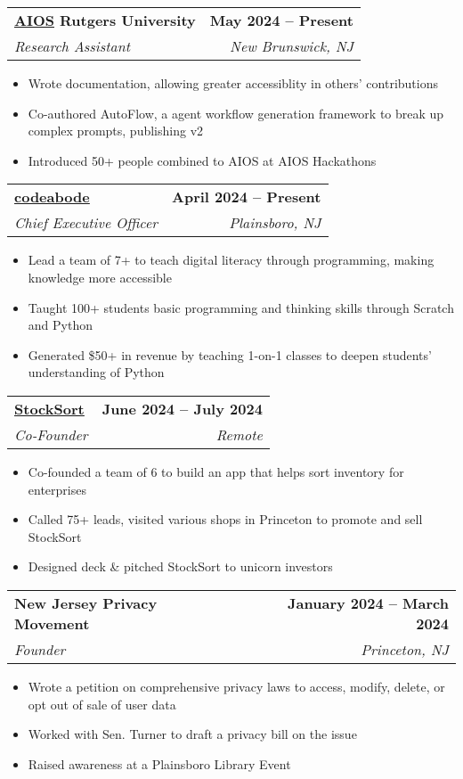 \documentclass[letterpaper,11pt]{article}
\makeatletter
\newcommand{\resumeItem}[1]{
  \item\small{
    {#1 \vspace{-2pt}}
  }
}
\newcommand{\resumeSubheading}[4]{
  \vspace{-2pt}\item
    \begin{tabular*}{1.0\textwidth}[t]{l@{\extracolsep{\fill}}r}
      \textbf{#1} & \textbf{\small #2} \\
      \textit{\small#3} & \textit{\small #4} \\
    \end{tabular*}\vspace{-7pt}
}
\newcommand{\resumeItemListStart}{\begin{itemize}}
\newcommand{\resumeItemListEnd}{\end{itemize}\vspace{-5pt}}
\makeatother
\begin{document}
   \resumeSubheading
     {\href{https://github.com/agiresearch/AIOS}{\underline{AIOS}} Rutgers University}{May 2024 -- Present}
     {Research Assistant}{New Brunswick, NJ}
     \resumeItemListStart
     \resumeItem{Wrote documentation, allowing greater accessiblity in others' contributions}
     \resumeItem{Co-authored AutoFlow, a agent workflow generation framework to break up complex prompts, publishing v2 }
     \resumeItem{Introduced 50+ people combined to AIOS at AIOS Hackathons}
   \resumeItemListEnd

   \resumeSubheading
      {\href{https://codeabode.co}{\underline{codeabode}}}{April 2024 -- Present}
      {Chief Executive Officer}{Plainsboro, NJ}
      \resumeItemListStart
        \resumeItem{Lead a team of 7+ to teach digital literacy through programming, making knowledge more accessible}
        \resumeItem{Taught 100+ students basic programming and thinking skills through Scratch and Python}
        \resumeItem{Generated \$50+ in revenue by teaching 1-on-1 classes to deepen students' understanding of Python}
      \resumeItemListEnd
      

    \resumeSubheading
      {\href{https://web.archive.org/web/20250119183417if_/https://stocksort.net/}{\underline{StockSort}}}{June 2024 -- July 2024}
      {Co-Founder}{Remote}
      \resumeItemListStart
        \resumeItem{Co-founded a team of 6 to build an app that helps sort inventory for enterprises}
        \resumeItem{Called 75+ leads, visited various shops in Princeton to promote and sell StockSort}
        \resumeItem{Designed deck \& pitched StockSort to unicorn investors}
      \resumeItemListEnd

    


    \resumeSubheading
      {New Jersey Privacy Movement}{January 2024 -- March 2024}
      {Founder}{Princeton, NJ}
      \resumeItemListStart
        \resumeItem{Wrote a petition on comprehensive privacy laws to access, modify, delete, or opt out of sale of user data}
        \resumeItem{Worked with Sen. Turner to draft a privacy bill on the issue}
        \resumeItem{Raised awareness at a Plainsboro Library Event}
    \resumeItemListEnd
\end{document}
